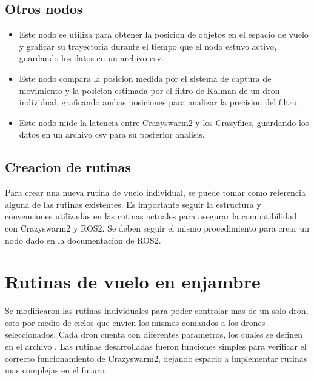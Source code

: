 \documentclass[a4paper,11pt,spanish]{sphinxmanual}
\begin{document}
\section{Otros nodos}
\label{\detokenize{rutinas_individuales:otros-nodos}}\begin{itemize}
\item {} 
\sphinxAtStartPar
{} Este nodo se utiliza para obtener la posicion de objetos en el espacio de vuelo y graficar su trayectoria durante el tiempo que el nodo estuvo activo, guardando los datos en un archivo csv.

\item {} 
\sphinxAtStartPar
{} Este nodo compara la posicion medida por el sistema de captura de movimiento y la posicion estimada por el filtro de Kalman de un dron individual, graficando ambas posiciones para analizar la precision del filtro.

\item {} 
\sphinxAtStartPar
{} Este nodo mide la latencia entre Crazyswarm2 y los Crazyflies, guardando los datos en un archivo csv para su posterior analisis.

\end{itemize}


\section{Creacion de rutinas}
\label{\detokenize{rutinas_individuales:creacion-de-rutinas}}
\sphinxAtStartPar
Para crear una nueva rutina de vuelo individual, se puede tomar como referencia alguna de las rutinas existentes. Es importante seguir la estructura y convenciones utilizadas en las rutinas actuales para asegurar la compatibilidad con Crazyswarm2 y ROS2. Se deben seguir el mismo procedimiento para crear un nodo dado en la documentacion de ROS2.

\sphinxstepscope


\chapter{Rutinas de vuelo en enjambre}
\label{\detokenize{rutinas_enjambre:rutinas-de-vuelo-en-enjambre}}\label{\detokenize{rutinas_enjambre::doc}}
\sphinxAtStartPar
Se modificaron las rutinas individuales para poder controlar mas de un solo dron, esto por medio de ciclos que envien los mismos comandos a los drones seleccionados. Cada dron cuenta con diferentes parametros, los cuales se definen en el archivo . Las rutinas desarrolladas fueron funciones simples para verificar el correcto funcionamiento de Crazyswarm2, dejando espacio a implementar rutinas mas complejas en el futuro.
\end{document}
